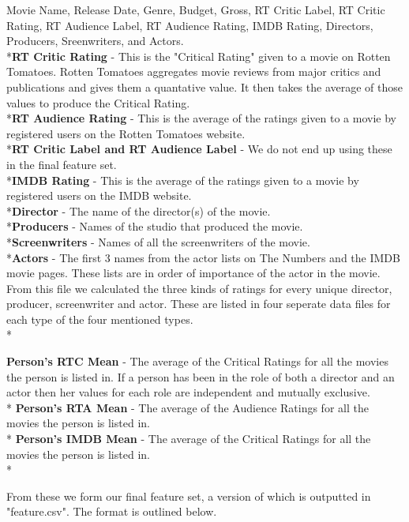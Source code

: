 \documentclass[conference]{IEEEtran}
\begin{document}
Movie Name, Release Date, Genre, Budget, Gross, RT Critic Label, RT Critic Rating, RT Audience Label, RT Audience Rating, IMDB Rating, Directors, Producers, Sreenwriters, and Actors.
\\*\textbf{RT Critic Rating} - This is the "Critical Rating" given to a movie on Rotten Tomatoes. Rotten Tomatoes aggregates movie reviews from major critics and publications and gives them a quantative value. It then takes the average of those values to produce the Critical Rating.
\\*\textbf{RT Audience Rating} - This is the average of the ratings given to a movie by registered users on the Rotten Tomatoes website.
\\*\textbf{RT Critic Label and RT Audience Label} - We do not end up using these in the final feature set. 
\\*\textbf{IMDB Rating} - This is the average of the ratings given to a movie by registered users on the IMDB website.
\\*\textbf{Director} - The name of the director(s) of the movie.
\\*\textbf{Producers} - Names of the studio that produced the movie.
\\*\textbf{Screenwriters} - Names of all the screenwriters of the movie.
\\*\textbf{Actors} - The first 3 names from the actor lists on The Numbers and the IMDB movie pages. These lists are in order of importance of the actor in the movie.\\
From this file we calculated the three kinds of ratings for every unique director, producer, screenwriter and actor. These are listed in four seperate data files for each type of the four mentioned types.\\*

\textbf{Person's RTC Mean} - The average of the Critical Ratings for all the movies the person is listed in. If a person has been in the role of both a director and an actor then her values for each role are independent and mutually exclusive.\\*
\textbf{Person's RTA Mean} - The average of the Audience Ratings for all the movies the person is listed in.\\*
\textbf{Person's IMDB Mean} - The average of the Critical Ratings for all the movies the person is listed in.\\*

From these we form our final feature set, a version of which is outputted in "feature.csv". The format is outlined below.
\end{document}
